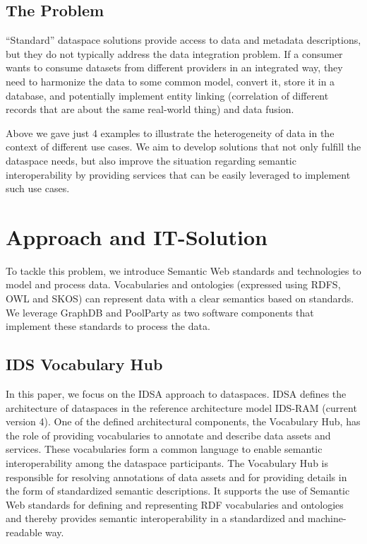 \documentclass[manuscript,screen]{acmart}
\begin{document}
\subsection{The Problem}\label{the-problem}

``Standard'' dataspace solutions provide access to data and metadata
descriptions, but they do not typically address the data integration
problem. If a consumer wants to consume datasets from different
providers in an integrated way, they need to harmonize the data to some
common model, convert it, store it in a database, and potentially
implement entity linking (correlation of different records that are
about the same real-world thing) and data fusion.

Above we gave just 4 examples to illustrate the heterogeneity of data in
the context of different use cases. We aim to develop solutions that not
only fulfill the dataspace needs, but also improve the situation
regarding semantic interoperability by providing services that can be
easily leveraged to implement such use cases.

\section{Approach and IT-Solution}\label{approach-and-it-solution}

To tackle this problem, we introduce Semantic Web standards and
technologies to model and process data. Vocabularies and ontologies
(expressed using RDFS, OWL and SKOS) can represent data with a clear
semantics based on standards. We leverage GraphDB and PoolParty as two
software components that implement these standards to process the data.

\subsection{IDS Vocabulary Hub}\label{ids-vocabulary-hub}

In this paper, we focus on the IDSA approach to dataspaces. IDSA defines
the architecture of dataspaces in the reference architecture model
IDS-RAM (current version 4). One of the defined architectural
components, the Vocabulary Hub, has the role of providing vocabularies
to annotate and describe data assets and services. These vocabularies
form a common language to enable semantic interoperability among the
dataspace participants. The Vocabulary Hub is responsible for resolving
annotations of data assets and for providing details in the form of
standardized semantic descriptions. It supports the use of Semantic Web
standards for defining and representing RDF vocabularies and ontologies
and thereby provides semantic interoperability in a standardized and
machine-readable way.
\end{document}
